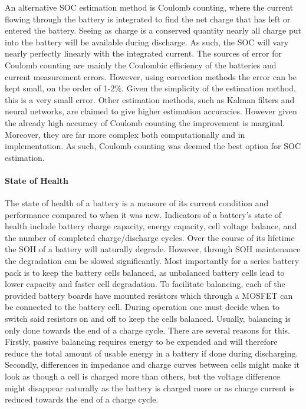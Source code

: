 \documentclass[a4paper]{article}
\begin{document}
An alternative SOC estimation method is Coulomb counting, where the current 
flowing through the battery is integrated to find the net charge that has 
left or entered the battery. Seeing as charge is a conserved quantity nearly 
all charge put into the battery will be available during discharge. As such, 
the SOC will vary nearly perfectly linearly with the integrated current. 
The sources of error for Coulomb counting are mainly the Coulombic efficiency 
of the batteries and current measurement errors. However, using correction 
methods the error can be kept small, on the order of 1-2\%\cite{NG20091506}. Given the 
simplicity of the estimation method, this is a very small error. Other 
estimation methods, such as Kalman filters and neural networks, are claimed 
to give higher estimation accuracies\cite{DANKO2019186}. However given the already high 
accuracy of Coulomb counting the improvement is marginal. Moreover, they 
are far more complex both computationally and in implementation. As such, 
Coulomb counting was deemed the best option for SOC estimation. 

\paragraph*{State of Health}
The state of health of a battery is a measure of its current condition and 
performance compared to when it was new\cite{mpower}. Indicators of a battery’s 
state of health include battery charge capacity, energy capacity, cell voltage 
balance, and the number of completed charge/discharge 
cycles\cite{https://doi.org/10.1002/er.3598}. Over the course of its lifetime 
the SOH of a battery will naturally degrade. However, through SOH maintenance 
the degradation can be slowed significantly. Most importantly for a series 
battery pack is to keep the battery cells balanced, as unbalanced battery 
cells lead to lower capacity and faster cell degradation\cite{texas}. To 
facilitate balancing, each of the provided battery boards have mounted 
resistors which through a MOSFET can be connected to the battery cell. During 
operation one must decide when to switch said resistors on and off to keep the 
cells balanced. Usually, balancing is only done towards the end of a charge cycle. 
There are several reasons for this. Firstly, passive balancing requires energy 
to be expended and will therefore reduce the total amount of usable energy 
in a battery if done during discharging. Secondly, differences in impedance 
and charge curves between cells might make it look as though a cell is charged 
more than others, but the voltage difference might disappear naturally as the 
battery is charged more or as charge current is reduced towards the end of a 
charge cycle.
\end{document}
